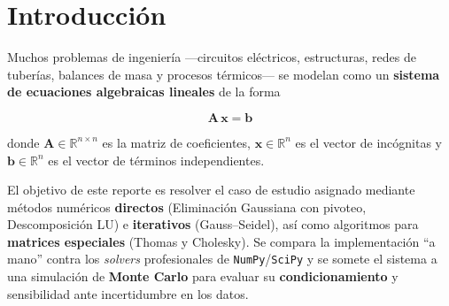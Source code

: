 \section{Introducción}
\label{sec:introduccion}

Muchos problemas de ingeniería —circuitos eléctricos, estructuras, redes de tuberías,
balances de masa y procesos térmicos— se modelan como un \textbf{sistema de ecuaciones
algebraicas lineales} de la forma

\begin{equation}
\mathbf{A}\,\mathbf{x} = \mathbf{b}
\label{eq:sistema}
\end{equation}

donde $\mathbf{A}\in\mathbb{R}^{n\times n}$ es la matriz de coeficientes,
$\mathbf{x}\in\mathbb{R}^{n}$ es el vector de incógnitas y
$\mathbf{b}\in\mathbb{R}^{n}$ es el vector de términos independientes.

El objetivo de este reporte es resolver el caso de estudio asignado mediante métodos
numéricos \textbf{directos} (Eliminación Gaussiana con pivoteo, Descomposición LU) e
\textbf{iterativos} (Gauss--Seidel), así como algoritmos para \textbf{matrices especiales}
(Thomas y Cholesky). Se compara la implementación ``a mano'' contra los \emph{solvers}
profesionales de \texttt{NumPy}/\texttt{SciPy} y se somete el sistema a una simulación de
\textbf{Monte Carlo} para evaluar su \textbf{condicionamiento} y sensibilidad ante
incertidumbre en los datos.


